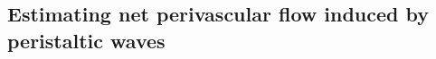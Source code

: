 \documentclass[fleqn,10pt]{wlscirep}
\begin{document}




\subsection{Estimating net perivascular flow induced by peristaltic waves}
\label{sec:app:peristalsis}
\end{document}
